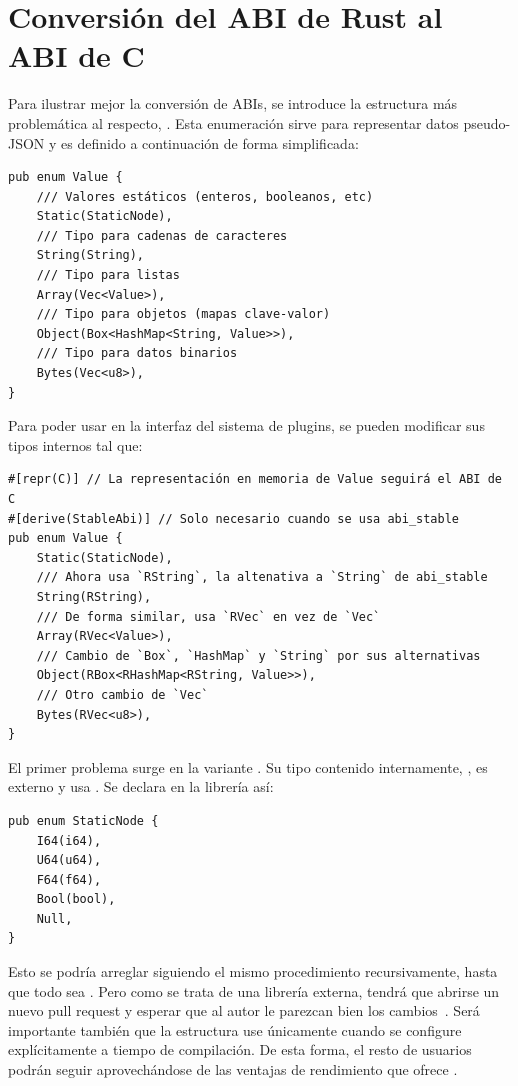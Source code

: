 \chapter{Conversión del ABI de Rust al ABI de C}\label{annex:abi}

Para ilustrar mejor la conversión de ABIs, se introduce la estructura más
problemática al respecto, . Esta enumeración sirve para representar
datos pseudo-JSON y es definido a continuación de forma simplificada:

\begin{verbatim}
pub enum Value {
    /// Valores estáticos (enteros, booleanos, etc)
    Static(StaticNode),
    /// Tipo para cadenas de caracteres
    String(String),
    /// Tipo para listas
    Array(Vec<Value>),
    /// Tipo para objetos (mapas clave-valor)
    Object(Box<HashMap<String, Value>>),
    /// Tipo para datos binarios
    Bytes(Vec<u8>),
}
\end{verbatim}

Para poder usar  en la interfaz del sistema de plugins, se pueden
modificar sus tipos internos tal que:

\begin{verbatim}
#[repr(C)] // La representación en memoria de Value seguirá el ABI de C
#[derive(StableAbi)] // Solo necesario cuando se usa abi_stable
pub enum Value {
    Static(StaticNode),
    /// Ahora usa `RString`, la altenativa a `String` de abi_stable
    String(RString),
    /// De forma similar, usa `RVec` en vez de `Vec`
    Array(RVec<Value>),
    /// Cambio de `Box`, `HashMap` y `String` por sus alternativas
    Object(RBox<RHashMap<RString, Value>>),
    /// Otro cambio de `Vec`
    Bytes(RVec<u8>),
}
\end{verbatim}

El primer problema surge en la variante . Su tipo contenido
internamente, , es externo y usa . Se
declara en la librería  así:

\begin{verbatim}
pub enum StaticNode {
    I64(i64),
    U64(u64),
    F64(f64),
    Bool(bool),
    Null,
}
\end{verbatim}

Esto se podría arreglar siguiendo el mismo procedimiento recursivamente, hasta
que todo sea \rust{#[repr(C)]}. Pero como se trata de una librería externa,
tendrá que abrirse un nuevo pull request y esperar que al autor le parezcan bien
los cambios~\cite{openstaticnode}. Será importante también que la estructura use
\rust{#[repr(C)]} únicamente cuando se configure explícitamente a tiempo de
compilación. De esta forma, el resto de usuarios podrán seguir aprovechándose de
las ventajas de rendimiento que ofrece .

